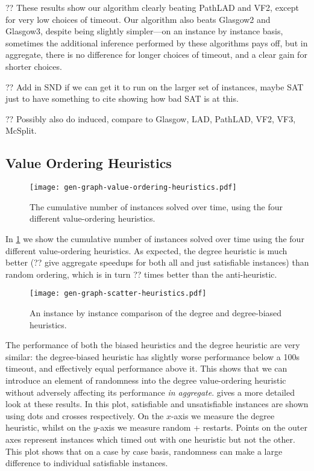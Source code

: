\documentclass{article}
\begin{document}
?? These results show our algorithm clearly beating PathLAD and VF2, except for very low choices of
timeout. Our algorithm also beats Glasgow2 and Glasgow3, despite being slightly simpler---on an
instance by instance basis, sometimes the additional inference performed by these algorithms pays
off, but in aggregate, there is no difference for longer choices of timeout, and a clear gain for
shorter choices.

?? Add in SND if we can get it to run on the larger set of instances, maybe SAT just to have
something to cite showing how bad SAT is at this.

?? Possibly also do induced, compare to Glasgow, LAD, PathLAD, VF2, VF3, McSplit.

\subsection{Value Ordering Heuristics}

\begin{figure}[tb]
    \centering
    \texttt{[image: gen-graph-value-ordering-heuristics.pdf]}

    \caption{The cumulative number of instances solved over time, using the four different
    value-ordering heuristics.}
    \label{figure:value-ordering-heuristics}
\end{figure}

In \cref{figure:value-ordering-heuristics} we show the cumulative number of instances solved over
time using the four different value-ordering heuristics. As expected, the degree heuristic is much
better (?? give aggregate speedups for both all and just satisfiable instances) than random
ordering, which is in turn ?? times better than the anti-heuristic.

\begin{figure}[tb]
    \centering
    \texttt{[image: gen-graph-scatter-heuristics.pdf]}

    \caption{An instance by instance comparison of the degree and degree-biased heuristics.}
    \label{figure:scatter-heuristics}
\end{figure}

The performance of both the biased heuristics and the degree heuristic are very similar: the
degree-biased heuristic has slightly worse performance below a 100s timeout, and effectively equal
performance above it. This shows that we can introduce an element of randomness into the degree
value-ordering heuristic without adversely affecting its performance \emph{in aggregate}.
 gives a more detailed look at these results. In this plot,
satisfiable and unsatisfiable instances are shown using dots and crosses respectively. On the
$x$-axis we measure the degree heuristic, whilst on the $y$-axis we measure random + restarts.
Points on the outer axes represent instances which timed out with one heuristic but not the other.
This plot shows that on a case by case basis, randomness can make a large difference to individual
satisfiable instances.
\end{document}
